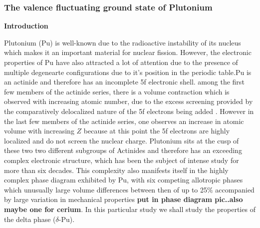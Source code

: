 \documentclass[10pt]{ruthesis}
\begin{document}
{\subsubsection{The valence fluctuating ground state of Plutonium}

\textbf{Introduction}

Plutonium (Pu) is well-known due to the radioactive instability of its nucleus which makes it an important material for nuclear fission. However, the electronic properties of Pu have also attracted a lot of attention due to the presence of multiple degenearte configurations due to it's position in the periodic table.Pu is an actinide and therefore has an incomplete 5f electronic shell.  among the first few members of the actinide series, there is a volume contraction which is observed with increasing atomic number, due to the excess screening provided by the comparatively delocalized nature of the 5f electrons being added . However in the last few members of the actinide series, one observes an increase in atomic volume with increasing $Z$ because at this point the 5f electrons are highly localized and do not screen the nuclear charge. Plutonium sits at the cusp of these two two different subgroups of Actinides and therefore has an exceeding complex electronic structure, which has been the subject of intense study for more than six decades. This complexity also manifests itself in the highly complex phase diagram exhibited by Pu, with six competing allotropic phases which unusually large volume differences between then of up to 25$\%$ accompanied by large variation in mechanical properties \textbf{put in phase diagram pic..also maybe one for cerium}. In this particular study we shall study the properties of the delta phase ($\delta$-Pu). 



}
\end{document}
